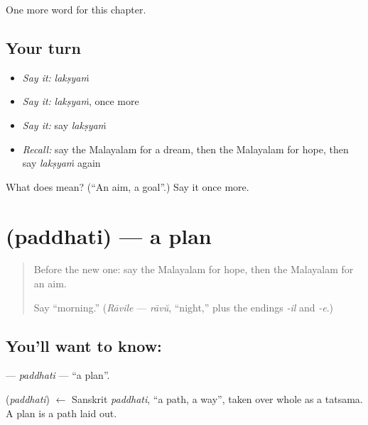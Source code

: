 \begin{grammarlens}[title={What you've built}]
One more word for this chapter.
\end{grammarlens}

\subsection*{Your turn}
\begin{itemize}
\raggedright
  \item \emph{Say it:} \emph{lakṣyaṁ}
  \item \emph{Say it:} \emph{lakṣyaṁ}, once more
  \item \emph{Say it:} say \emph{lakṣyaṁ}
  \item \emph{Recall:} say the Malayalam for a dream, then the Malayalam for hope, then say \emph{lakṣyaṁ} again
\end{itemize}

\begin{tcolorbox}[breakable,colback=teal!4,colframe=teal!35!black,title={Before you move on}]
What does  mean? (\textquotedblleft{}An aim, a goal\textquotedblright{}.) Say it once more.
\end{tcolorbox}
\section[\texorpdfstring{\ml{പദ്ധതി} (paddhati)}{പദ്ധതി (paddhati)}]{ (paddhati) — a plan}

\label{lesson:ML-C145-paddhati}



\begin{quote}
Before the new one: say the Malayalam for hope, then the Malayalam for an aim.

Say \textquotedblleft{}morning.\textquotedblright{} (\emph{Rāvile} — \emph{rāvŭ}, \textquotedblleft{}night,\textquotedblright{} plus the endings \emph{-il} and \emph{-e}.)
\end{quote}

\subsection*{You'll want to know: }
\textbf{} — \emph{paddhati} — \textquotedblleft{}a plan\textquotedblright{}.

\begin{cousinweb}
\textbf{} (\emph{paddhati}) $\leftarrow$ Sanskrit \emph{paddhati}, \textquotedblleft{}a path, a way\textquotedblright{}, taken over whole as a tatsama. A plan is a path laid out.
\end{cousinweb}

